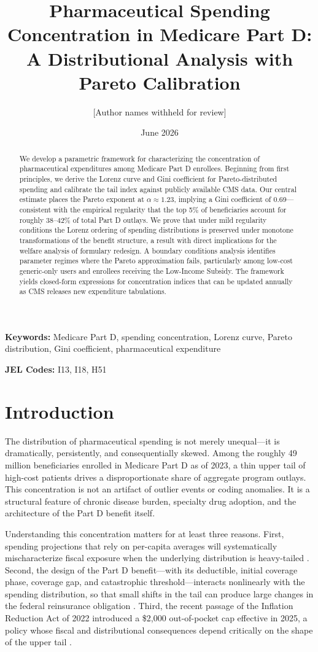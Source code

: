 \documentclass[12pt,letterpaper]{article}
\title{Pharmaceutical Spending Concentration in Medicare Part D:\\
A Distributional Analysis with Pareto Calibration}
\author{%
  [Author names withheld for review]
}
\date{June 2026}
\begin{document}
\maketitle

\begin{abstract}
We develop a parametric framework for characterizing the concentration of
pharmaceutical expenditures among Medicare Part D enrollees. Beginning from
first principles, we derive the Lorenz curve and Gini coefficient for
Pareto-distributed spending and calibrate the tail index against publicly
available CMS data. Our central estimate places the Pareto exponent at
$\alpha \approx 1.23$, implying a Gini coefficient of 0.69---consistent with
the empirical regularity that the top 5\% of beneficiaries account for
roughly 38--42\% of total Part D outlays. We prove that under mild regularity
conditions the Lorenz ordering of spending distributions is preserved under
monotone transformations of the benefit structure, a result with direct
implications for the welfare analysis of formulary redesign. A boundary
conditions analysis identifies parameter regimes where the Pareto
approximation fails, particularly among low-cost generic-only users and
enrollees receiving the Low-Income Subsidy. The framework yields closed-form
expressions for concentration indices that can be updated annually as CMS
releases new expenditure tabulations.
\end{abstract}

\textbf{Keywords:} Medicare Part D, spending concentration, Lorenz curve,
Pareto distribution, Gini coefficient, pharmaceutical expenditure

\textbf{JEL Codes:} I13, I18, H51

\section{Introduction}

The distribution of pharmaceutical spending is not merely unequal---it is
dramatically, persistently, and consequentially skewed. Among the roughly 49
million beneficiaries enrolled in Medicare Part D as of 2023, a thin upper
tail of high-cost patients drives a disproportionate share of aggregate
program outlays. This concentration is not an artifact of outlier events or
coding anomalies. It is a structural feature of chronic disease burden,
specialty drug adoption, and the architecture of the Part D benefit itself.

Understanding this concentration matters for at least three reasons. First,
spending projections that rely on per-capita averages will systematically
mischaracterize fiscal exposure when the underlying distribution is heavy-tailed
\citep{Zuvekas2009}. Second, the design of the Part D benefit---with its
deductible, initial coverage phase, coverage gap, and catastrophic threshold---interacts
nonlinearly with the spending distribution, so that small shifts in the tail can
produce large changes in the federal reinsurance obligation
\citep{Duggan2008}. Third, the recent passage of the Inflation Reduction Act
of 2022 introduced a \$2,000 out-of-pocket cap effective in 2025, a policy
whose fiscal and distributional consequences depend critically on the shape of
the upper tail \citep{CBO2022}.
\end{document}
